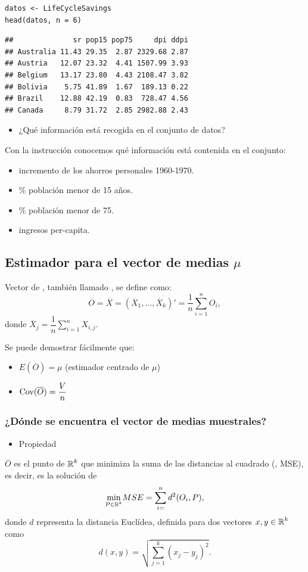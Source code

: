 \begin{lstlisting}
datos <- LifeCycleSavings
head(datos, n = 6)
\end{lstlisting}

\begin{verbatim}
##              sr pop15 pop75     dpi ddpi
## Australia 11.43 29.35  2.87 2329.68 2.87
## Austria   12.07 23.32  4.41 1507.99 3.93
## Belgium   13.17 23.80  4.43 2108.47 3.82
## Bolivia    5.75 41.89  1.67  189.13 0.22
## Brazil    12.88 42.19  0.83  728.47 4.56
## Canada     8.79 31.72  2.85 2982.88 2.43
\end{verbatim}

\begin{itemize}[label=\color{red}\textbullet, leftmargin=*]
	\item \color{lightblue}¿Qué información está recogida en el conjunto de datos?
\end{itemize}
Con la instrucción  conocemos qué información está contenida en el conjunto:
\begin{itemize}
\item {} incremento de los ahorros personales 1960-1970.
\item {} \% población menor de 15 años.
\item {} \% población menor de 75.
\item {} ingresos per-capita.
\end{itemize}
\subsection{Estimador para el vector de medias $\mu$}
Vector de , también llamado , se define como: \[ \overline{O}=\overline{X}=\left(\overline{X}_1,\dots,\overline{X}_k\right)'=\dfrac{1}{n}\sum_{i=1}^{n}O_i, \] donde $ \overline{X}_j=\dfrac{1}{n}\sum_{i=1}^{n}X_{i,j}$.

Se puede demostrar fácilmente que:
\begin{itemize}[label=$\to$]
\item $E(\overline{O})=\mu$ (estimador centrado de $\mu$)
\item $\operatorname{Cov}(\overline{O})=\dfrac{V}{n}$
\end{itemize}
\subsubsection{¿Dónde se encuentra el vector de medias muestrales?}
\begin{itemize}[label=\color{red}\textbullet, leftmargin=*]
	\item \color{lightblue}Propiedad
\end{itemize}
$\overline{O}$ es el punto de $\operatorname{\mathbb{R}}^k$ que minimiza la suma de las distancias al cuadrado (, MSE), es decir, es la solución de \[ \underset{P\in\operatorname{\mathbb{R}}^k}{\min}MSE=\sum_{i=}^{n}d^2(O_i,P), \] donde $d$ representa la distancia Euclídea, definida para dos vectores $x,y\in\operatorname{\mathbb{R}}^k$ como \[ d(x,y)=\sqrt{\sum_{j=1}^{k}(x_j-y_j)^2}. \]
